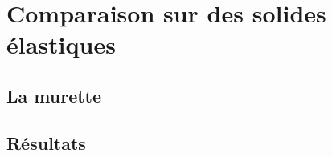 \documentclass{CSMA2017}
\begin{document}
\section{Comparaison sur des solides élastiques}

\subsection{La murette}

\subsection{Résultats}
\end{document}
